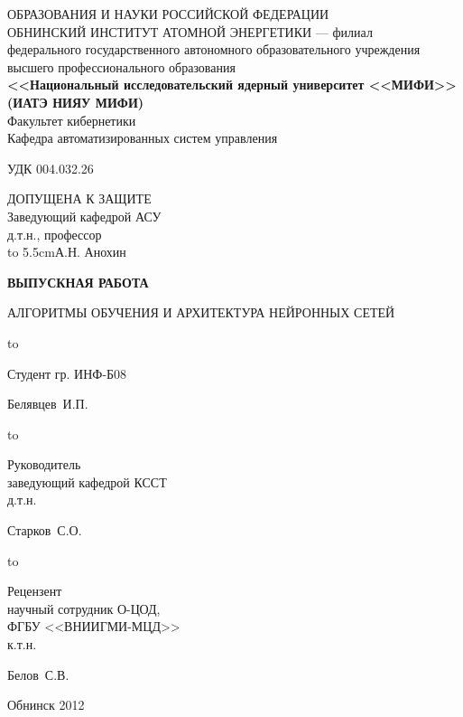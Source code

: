 \begin{titlepage}
\newpage

\begin{center}
{\small{} ОБРАЗОВАНИЯ И НАУКИ РОССИЙСКОЙ ФЕДЕРАЦИИ\\
ОБНИНСКИЙ ИНСТИТУТ АТОМНОЙ ЭНЕРГЕТИКИ --- филиал}\\
федерального государственного автономного образовательного учреждения\\
высшего профессионального образования\\
{\bf<<Национальный исследовательский ядерный университет <<МИФИ>>\\
(ИАТЭ НИЯУ МИФИ)}\\
\vspace{2em}
Факультет кибернетики\\
Кафедра автоматизированных систем управления
\end{center}
\vspace{2em}
УДК 004.032.26
\hfill
\parbox{5.5cm}
{
ДОПУЩЕНА К ЗАЩИТЕ\\
Заведующий кафедрой АСУ\\
д.т.н., профессор\\
\hbox to 5.5cm{\dotfill А.Н. Анохин}
}
\vspace{5em}
\begin{center}
\textbf{ВЫПУСКНАЯ РАБОТА}
\end{center}


\begin{center}
АЛГОРИТМЫ ОБУЧЕНИЯ И АРХИТЕКТУРА НЕЙРОННЫХ СЕТЕЙ
\end{center}

\vspace{6em}

\hbox to \textwidth
{\parbox{6 cm}{Студент гр. ИНФ-Б08}\dotfill \parbox{4 cm}{
\begin{flushright}Белявцев~И.П.\end{flushright}}}
\vspace{2em}

\hbox to \textwidth
{\parbox{6 cm}{Руководитель\\ заведующий кафедрой КССТ\\ д.т.н.}\dotfill \parbox{4 cm}{
\begin{flushright}Старков~С.О.\end{flushright}}}
\vspace{2em}

\hbox to \textwidth
{\parbox{6 cm}{Рецензент\\ научный сотрудник О-ЦОД, \\
ФГБУ <<ВНИИГМИ-МЦД>>\\к.т.н.}\dotfill \parbox{4 cm}{
\begin{flushright}Белов~С.В.\end{flushright}}}

\vspace{\fill}

\begin{center}
Обнинск 2012
\end{center}

\end{titlepage}